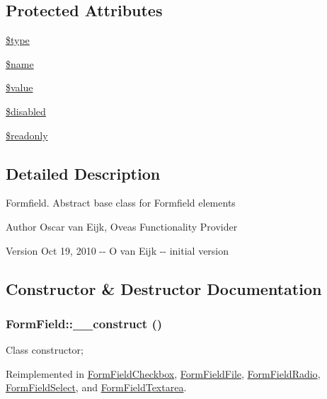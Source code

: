 \subsection*{Protected Attributes}
\begin{DoxyCompactItemize}
\item 
\hyperlink{classFormField_a37bed21a1891e95be0e4a697e45ba51b}{\$type}
\item 
\hyperlink{classFormField_a23861f707bcd77bbace6300de9621746}{\$name}
\item 
\hyperlink{classFormField_a3c01e89834248eec8e2f145fbcfa0fbc}{\$value}
\item 
\hyperlink{classFormField_ab6f1907061890290e32cb2befc0a5f50}{\$disabled}
\item 
\hyperlink{classFormField_a78ba5d4b9127e75e8ccf86f397b5d9ac}{\$readonly}
\end{DoxyCompactItemize}


\subsection{Detailed Description}
Formfield. Abstract base class for Formfield elements \begin{DoxyAuthor}{Author}
Oscar van Eijk, Oveas Functionality Provider 
\end{DoxyAuthor}
\begin{DoxyVersion}{Version}
Oct 19, 2010 -\/-\/ O van Eijk -\/-\/ initial version 
\end{DoxyVersion}


\subsection{Constructor \& Destructor Documentation}
\subsubsection[{\_\-\_\-construct}]{\setlength{\rightskip}{0pt plus 5cm}FormField::\_\-\_\-construct ()}\label{classFormField_a0cfe713ce28a6a0cb53476ed463e1f01}
Class constructor; 

Reimplemented in \hyperlink{classFormFieldCheckbox_a9ea37cd03013e361f11680049c1a0097}{FormFieldCheckbox}, \hyperlink{classFormFieldFile_a2e19b30454dd3ed054772868bf6eebad}{FormFieldFile}, \hyperlink{classFormFieldRadio_ae82224cf68e3513e29923c24f42eb06d}{FormFieldRadio}, \hyperlink{classFormFieldSelect_a32c59192be8c316fb2f7e1edde8f0a98}{FormFieldSelect}, and \hyperlink{classFormFieldTextarea_a65e5d308db60f1ca0d08085d09dea8bc}{FormFieldTextarea}.



